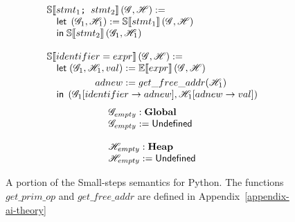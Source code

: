 \begin{figure}
\begin{minipage}{.46\textwidth}
\[
  \begin{array}{l}
    \mathbb{S}\!\left\llbracket stmt_1\texttt{; } stmt_2 \right\rrbracket\left(\mathscr{G}, \mathscr{H}\right) := \\
    \quad \mathsf{let}\; \left(\mathscr{G}_1, \mathscr{H}_1\right) := \mathbb{S}\!\left\llbracket stmt_1 \right\rrbracket\left(\mathscr{G}, \mathscr{H}\right) \\
    \quad \mathsf{in}\; \mathbb{S}\!\left\llbracket stmt_2 \right\rrbracket\left(\mathscr{G}_1, \mathscr{H}_1\right) \\
    \\
    \mathbb{S}\!\left\llbracket identifier = expr \right\rrbracket\left(\mathscr{G}, \mathscr{H}\right) := \\
    \quad \mathsf{let}\;
    \begin{aligned}[t]
      \left(\mathscr{G}_1, \mathscr{H}_1, val\right) &:= \mathbb{E}\!\left\llbracket expr \right\rrbracket\left(\mathscr{G}, \mathscr{H}\right) \\
      adnew &:= get\_free\_addr(\mathscr{H}_1) \\
    \end{aligned}\\
    \quad \mathsf{in}\; \left(\mathscr{G}_1[identifier \to adnew], \mathscr{H}_1[adnew \to val]\right) \\
  \end{array}
\]
\[
  \begin{array}{l}
    \mathscr{G}_{empty} : \mathbf{Global} \\
    \mathscr{G}_{empty} := \mathsf{Undefined} \\
    \\
    \mathscr{H}_{empty} : \mathbf{Heap} \\
    \mathscr{H}_{empty} := \mathsf{Undefined} \\
  \end{array}
\]
\end{minipage}
\caption{A portion of the Small-steps semantics for Python. The functions $get\_prim\_op$
  and $get\_free\_addr$ are defined in Appendix~\ref{appendix-ai-theory}\label{smallstep1}}
\end{figure}

%
%

